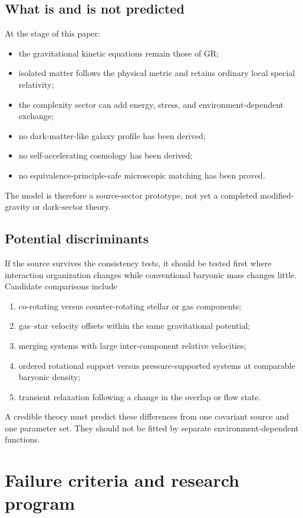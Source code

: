 \documentclass[11pt]{article}
\begin{document}
\subsection{What is and is not predicted}

At the stage of this paper:
\begin{itemize}
\item the gravitational kinetic equations remain those of GR;
\item isolated matter follows the physical metric and retains ordinary local special relativity;
\item the complexity sector can add energy, stress, and environment-dependent exchange;
\item no dark-matter-like galaxy profile has been derived;
\item no self-accelerating cosmology has been derived;
\item no equivalence-principle-safe microscopic matching has been proved.
\end{itemize}
The model is therefore a source-sector prototype, not yet a completed modified-gravity or dark-sector theory.

\subsection{Potential discriminants}

If the source survives the consistency tests, it should be tested first where interaction organization changes while conventional baryonic mass changes little.  Candidate comparisons include
\begin{enumerate}[label=(\roman*)]
\item co-rotating versus counter-rotating stellar or gas components;
\item gas--star velocity offsets within the same gravitational potential;
\item merging systems with large inter-component relative velocities;
\item ordered rotational support versus pressure-supported systems at comparable baryonic density;
\item transient relaxation following a change in the overlap or flow state.
\end{enumerate}
A credible theory must predict these differences from one covariant source and one parameter set.  They should not be fitted by separate environment-dependent functions.

\section{Failure criteria and research program}
\end{document}
